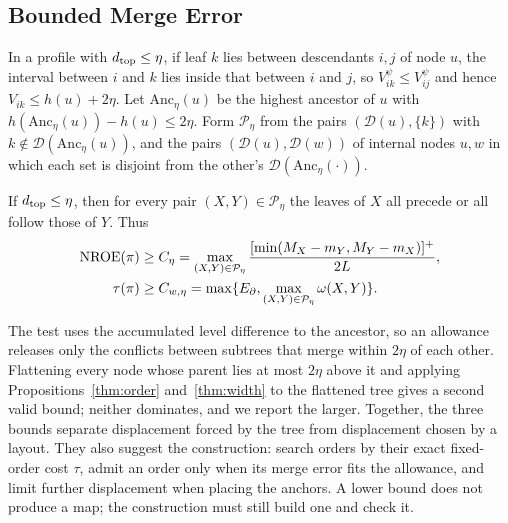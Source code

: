 \subsection{Bounded Merge Error}
In a profile with $d_{\mathrm{top}}\le\eta$, if leaf $k$ lies between descendants $i,j$ of node $u$, the interval between $i$ and $k$ lies inside that between $i$ and $j$, so $V_{ik}^{\psi}\le V_{ij}^{\psi}$ and hence $V_{ik}\le h(u)+2\eta$. Let $\mathrm{Anc}_\eta(u)$ be the highest ancestor of $u$ with $h(\mathrm{Anc}_\eta(u))-h(u)\le2\eta$. Form $\mathcal P_\eta$ from the pairs $(\mathcal D(u),\{k\})$ with $k\notin\mathcal D(\mathrm{Anc}_\eta(u))$, and the pairs $(\mathcal D(u),\mathcal D(w))$ of internal nodes $u,w$ in which each set is disjoint from the other's $\mathcal D(\mathrm{Anc}_\eta(\cdot))$.
\begin{proposition}\label{thm:chain}
If $d_{\mathrm{top}}\le\eta$, then for every pair $(X,Y)\in\mathcal P_\eta$ the leaves of $X$ all precede or all follow those of $Y$. Thus
\begin{equation}\label{eq:chainbounds}
\begin{split}
\mathrm{NROE}(\pi)&\ge C_\eta=\max_{(X,Y)\in\mathcal P_\eta}\frac{[\min(M_X-m_Y,M_Y-m_X)]^+}{2L},\\
\tau(\pi)&\ge C_{w,\eta}=\max\{E_\partial,\max_{(X,Y)\in\mathcal P_\eta}\omega(X,Y)\}.
\end{split}
\end{equation}
\end{proposition}
The test uses the accumulated level difference to the ancestor, so an allowance releases only the conflicts between subtrees that merge within $2\eta$ of each other. Flattening every node whose parent lies at most $2\eta$ above it and applying Propositions~\ref{thm:order} and~\ref{thm:width} to the flattened tree gives a second valid bound; neither dominates, and we report the larger. Together, the three bounds separate displacement forced by the tree from displacement chosen by a layout. They also suggest the construction: search orders by their exact fixed-order cost $\tau$, admit an order only when its merge error fits the allowance, and limit further displacement when placing the anchors. A lower bound does not produce a map; the construction must still build one and check it.
